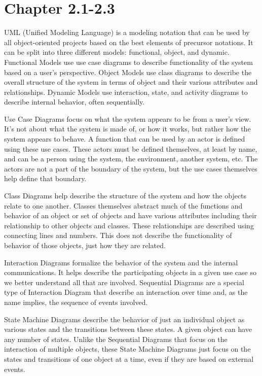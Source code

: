 \documentclass[prb,preprint]{revtex4-2}
\begin{document}
\section*{Chapter 2.1-2.3}
UML (Unified Modeling Language) is a modeling notation that can be used by all object-oriented projects based on the best elements of precursor notations. It can be split into three different models: functional, object, and dynamic. Functional Models use use case diagrams to describe functionality of the system based on a user's perspective. Object Models use class diagrams to describe the overall structure of the system in terms of object and their various attributes and relationships. Dynamic Models use interaction, state, and activity diagrams to describe internal behavior, often sequentially. 

Use Case Diagrams focus on what the system appears to be from a user's view. It's not about what the system is made of, or how it works, but rather how the system appears to behave. A function that can be used by an actor is defined using these use cases. These actors must be defined themselves, at least by name, and can be a person using the system, the environment, another system, etc. The actors are not a part of the boundary of the system, but the use cases themselves help define that boundary. 

Class Diagrams help describe the structure of the system and how the objects relate to one another. Classes themselves abstract much of the functions and behavior of an object or set of objects and have various attributes including their relationship to other objects and classes.  These relationships are described using connecting lines and numbers. This does not describe the functionality of behavior of those objects, just how they are related.

Interaction Diagrams formalize the behavior of the system and the internal communications. It helps describe the participating objects in a given use case so we better understand all that are involved. Sequential Diagrams are a special type of Interaction Diagram that describe an interaction over time and, as the name implies, the sequence of events involved.

State Machine Diagrams describe the behavior of just an individual object as various states and the transitions between these states. A given object can have any number of states. Unlike the Sequential Diagrams that focus on the interaction of multiple objects, these State Machine Diagrams just focus on the states and transitions of one object at a time, even if they are based on external events.
\end{document}
